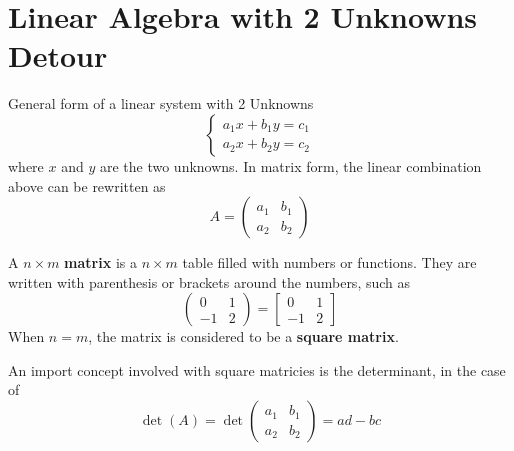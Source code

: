 \documentclass[twoside]{report}
\begin{document}
    \section{Linear Algebra with 2 Unknowns Detour}
    \begin{definition}
        General form of a linear system with 2 Unknowns
        \begin{equation}
            \begin{cases}
                a_{1}x + b_{1}y = c_{1}\\
                a_{2}x + b_{2}y = c_{2}
            \end{cases}
        \end{equation}
        where $x$ and $y$ are the two unknowns.
        In matrix form, the linear combination above can be rewritten as
        \begin{equation}
            A = 
            \begin{pmatrix}
                a_{1} & b_{1}\\
                a_{2} & b_{2}
            \end{pmatrix}
        \end{equation}
    \end{definition}
    \begin{definition}[Matricies]
        A $n \times m$ \textbf{matrix} is a $n \times m$ table filled with numbers or functions. They are written with parenthesis or brackets around the numbers, such as
        \begin{equation}
            \begin{pmatrix}
                0 & 1\\
                -1 & 2
            \end{pmatrix}=
            \begin{bmatrix}
                0 & 1\\
                -1 & 2
            \end{bmatrix}
        \end{equation}
        When $n = m$, the matrix is considered to be a \textbf{square matrix}.
    \end{definition}
    \np
    \begin{definition}[Determinant]
        An import concept involved with square matricies is the determinant, in the case of
        \begin{equation}
            \det(A) = 
        \det\begin{pmatrix}
            a_{1} & b_{1}\\
            a_{2} & b_{2}
        \end{pmatrix} = ad - bc
        \end{equation}
    \end{definition}
\end{document}
